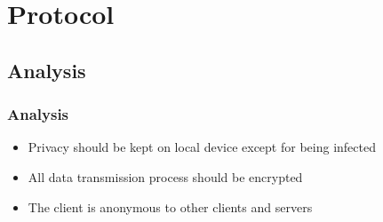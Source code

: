 \documentclass{beamer}
\begin{document}




\section{Protocol}
\subsection{Analysis}
\begin{frame}
  \frametitle{Analysis}
  \begin{itemize}
    \item Privacy should be kept on local device except for being infected
    \item All data transmission process should be encrypted
    \item The client is anonymous to other clients and servers
  \end{itemize}

\end{frame}
\end{document}
